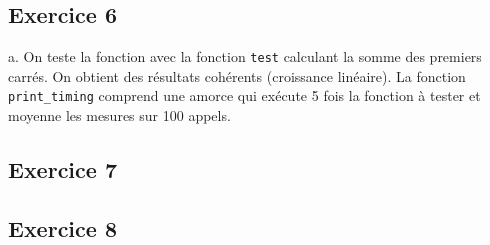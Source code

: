 \documentclass[11pt, a4 paper]{article}
\begin{document}
\subsection{Exercice 6}
a. On teste la fonction avec la fonction \texttt{test} calculant la somme des premiers carrés. On obtient des résultats cohérents (croissance linéaire). La fonction \texttt{print\_timing} comprend une amorce qui exécute 5 fois la fonction à tester et moyenne les mesures sur 100 appels.
\subsection{Exercice 7}
\subsection{Exercice 8}
\end{document}
